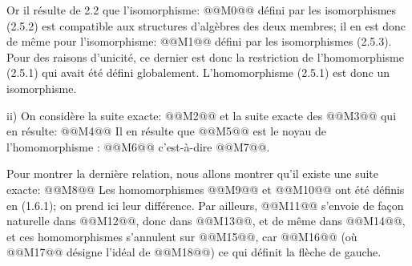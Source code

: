 
Or il
résulte de 2.2 que l'isomorphisme:
@@M0@@
défini par les isomorphismes (2.5.2) est compatible aux structures d'algèbres des deux membres; il en est donc de même pour l'isomorphisme:
@@M1@@
défini par les isomorphismes (2.5.3). Pour des raisons d'unicité, ce dernier est donc la restriction de l'homomorphisme (2.5.1) qui avait été défini globalement. L'homomorphisme (2.5.1) est donc un isomorphisme.

ii) On considère la suite exacte:
@@M2@@
et la suite exacte des @@M3@@ qui en résulte:
@@M4@@
Il en résulte que @@M5@@ est le noyau de l'homomorphisme :
@@M6@@
c'est-à-dire @@M7@@.

Pour montrer la dernière relation, nous allons montrer qu'il existe une suite exacte:
@@M8@@
Les homomorphismes @@M9@@ et @@M10@@ ont été définis en (1.6.1); on prend ici leur différence. Par ailleurs, @@M11@@ s'envoie de façon naturelle dans @@M12@@, donc dans @@M13@@, et de même dans @@M14@@, et ces homomorphismes s'annulent sur @@M15@@, car @@M16@@ (où @@M17@@ désigne l'idéal de @@M18@@) ce qui définit la flèche de gauche.

